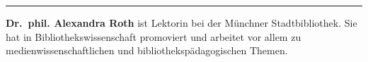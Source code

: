 \begin{center}\rule{0.5\linewidth}{0.5pt}\end{center}

\textbf{Dr.~phil. Alexandra Roth} ist Lektorin bei der Münchner
Stadtbibliothek. Sie hat in Bibliothekswissenschaft promoviert und
arbeitet vor allem zu medienwissenschaftlichen und
bibliothekspädagogischen Themen.
